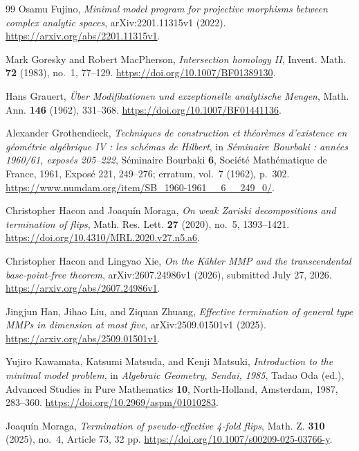 \documentclass[11pt]{amsart}
\theoremstyle{definition}
\theoremstyle{remark}
\numberwithin{equation}{section}
\begin{document}
\begin{thebibliography}{99}
Osamu Fujino,
\emph{Minimal model program for projective morphisms between complex analytic spaces},
arXiv:2201.11315v1 (2022).
\url{https://arxiv.org/abs/2201.11315v1}.

Mark Goresky and Robert MacPherson,
\emph{Intersection homology II},
Invent. Math. \textbf{72} (1983), no.~1, 77--129.
\url{https://doi.org/10.1007/BF01389130}.

Hans Grauert,
\emph{\"Uber Modifikationen und exzeptionelle analytische Mengen},
Math. Ann. \textbf{146} (1962), 331--368.
\url{https://doi.org/10.1007/BF01441136}.

Alexander Grothendieck,
\emph{Techniques de construction et th\'eor\`emes d'existence en g\'eom\'etrie
alg\'ebrique IV : les sch\'emas de Hilbert},
in \emph{S\'eminaire Bourbaki : ann\'ees 1960/61, expos\'es 205--222},
S\'eminaire Bourbaki \textbf{6}, Soci\'et\'e Math\'ematique de France,
1961, Expos\'e 221, 249--276; erratum, vol.~7 (1962), p.~302.
\url{https://www.numdam.org/item/SB_1960-1961__6__249_0/}.

Christopher Hacon and Joaqu\'in Moraga,
\emph{On weak Zariski decompositions and termination of flips},
Math. Res. Lett. \textbf{27} (2020), no.~5, 1393--1421.
\url{https://doi.org/10.4310/MRL.2020.v27.n5.a6}.

Christopher Hacon and Lingyao Xie,
\emph{On the K\"ahler MMP and the transcendental base-point-free theorem},
arXiv:2607.24986v1 (2026), submitted July 27, 2026.
\url{https://arxiv.org/abs/2607.24986v1}.

Jingjun Han, Jihao Liu, and Ziquan Zhuang,
\emph{Effective termination of general type MMPs in dimension at most five},
arXiv:2509.01501v1 (2025).
\url{https://arxiv.org/abs/2509.01501v1}.

Yujiro Kawamata, Katsumi Matsuda, and Kenji Matsuki,
\emph{Introduction to the minimal model problem},
in \emph{Algebraic Geometry, Sendai, 1985}, Tadao Oda (ed.),
Advanced Studies in Pure Mathematics \textbf{10},
North-Holland, Amsterdam, 1987, 283--360.
\url{https://doi.org/10.2969/aspm/01010283}.

Joaqu\'in Moraga,
\emph{Termination of pseudo-effective 4-fold flips},
Math. Z. \textbf{310} (2025), no.~4, Article 73, 32 pp.
\url{https://doi.org/10.1007/s00209-025-03766-y}.


\end{thebibliography}
\end{document}

